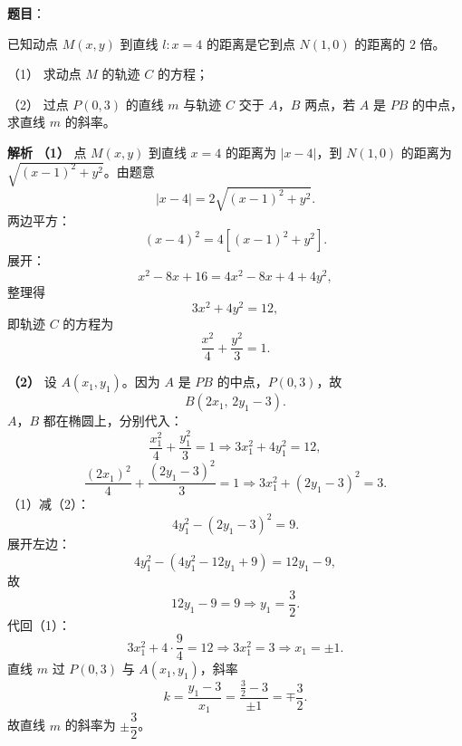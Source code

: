 \begin{answer}

\textbf{题目}：

已知动点 $M(x,y)$ 到直线 $l:x=4$ 的距离是它到点 $N(1,0)$ 的距离的 $2$ 倍。

（1） 求动点 $M$ 的轨迹 $C$ 的方程；

（2） 过点 $P(0,3)$ 的直线 $m$ 与轨迹 $C$ 交于 $A$，$B$ 两点，若 $A$ 是 $PB$ 的中点，求直线 $m$ 的斜率。

\textbf{解析}
\textbf{（1）} 点 $M(x,y)$ 到直线 $x=4$ 的距离为 $|x-4|$，到 $N(1,0)$ 的距离为 $\sqrt{(x-1)^2+y^2}$。由题意
\nopagebreak[4]
\[|x-4|=2\sqrt{(x-1)^2+y^2}.\]
两边平方：
\nopagebreak[4]
\[(x-4)^2=4\left[(x-1)^2+y^2\right].\]
展开：
\nopagebreak[4]
\[x^2-8x+16=4x^2-8x+4+4y^2,\]
整理得
\nopagebreak[4]
\[3x^2+4y^2=12,\]
即轨迹 $C$ 的方程为
\nopagebreak[4]
\[\frac{x^2}{4}+\frac{y^2}{3}=1.\]

\textbf{（2）} 设 $A(x_1,y_1)$。因为 $A$ 是 $PB$ 的中点，$P(0,3)$，故
\nopagebreak[4]
\[B(2x_1,\,2y_1-3).\]
$A$，$B$ 都在椭圆上，分别代入：
\nopagebreak[4]
\[\frac{x_1^2}{4}+\frac{y_1^2}{3}=1\Longrightarrow3x_1^2+4y_1^2=12, \tag{1}\]
\nopagebreak[4]
\[\frac{(2x_1)^2}{4}+\frac{(2y_1-3)^2}{3}=1\Longrightarrow3x_1^2+(2y_1-3)^2=3. \tag{2}\]
（1）减（2）：
\nopagebreak[4]
\[4y_1^2-(2y_1-3)^2=9.\]
展开左边：
\nopagebreak[4]
\[4y_1^2-(4y_1^2-12y_1+9)=12y_1-9,\]
故
\nopagebreak[4]
\[12y_1-9=9\Longrightarrow y_1=\frac32.\]
代回（1）：
\nopagebreak[4]
\[3x_1^2+4\cdot\frac94=12\Longrightarrow3x_1^2=3\Longrightarrow x_1=\pm1.\]
直线 $m$ 过 $P(0,3)$ 与 $A(x_1,y_1)$，斜率
\nopagebreak[4]
\[k=\frac{y_1-3}{x_1}=\frac{\frac32-3}{\pm1}=\mp\frac32.\]
故直线 $m$ 的斜率为 $\pm\dfrac32$。



\end{answer}

